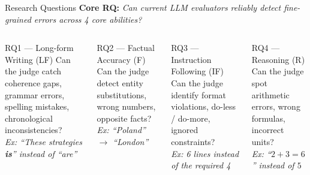 \documentclass[aspectratio=169,10pt]{beamer}
\begin{document}
\begin{frame}{Research Questions}
  \textbf{Core RQ:} \emph{Can current LLM evaluators reliably detect fine-grained errors across 4 core abilities?}

  \vspace{0.6em}
  \begin{columns}[T]
      \begin{block}{RQ1 — Long-form Writing (LF)}
        Can the judge catch coherence gaps, grammar errors, spelling mistakes, chronological inconsistencies?\\
        \small\textit{Ex: ``These strategies \textbf{is}'' instead of ``are''}
      \end{block}

      \vspace{0.4em}
      \begin{block}{RQ2 — Factual Accuracy (F)}
        Can the judge detect entity substitutions, wrong numbers, opposite facts?\\
        \small\textit{Ex: ``Poland'' $\to$ ``London''}
      \end{block}

      \begin{block}{RQ3 — Instruction Following (IF)}
        Can the judge identify format violations, do-less / do-more, ignored constraints?\\
        \small\textit{Ex: 6 lines instead of the required 4}
      \end{block}

      \vspace{0.4em}
      \begin{block}{RQ4 — Reasoning (R)}
        Can the judge spot arithmetic errors, wrong formulas, incorrect units?\\
        \small\textit{Ex: ``$2+3=6$'' instead of $5$}
      \end{block}
  \end{columns}
\end{frame}
\end{document}
